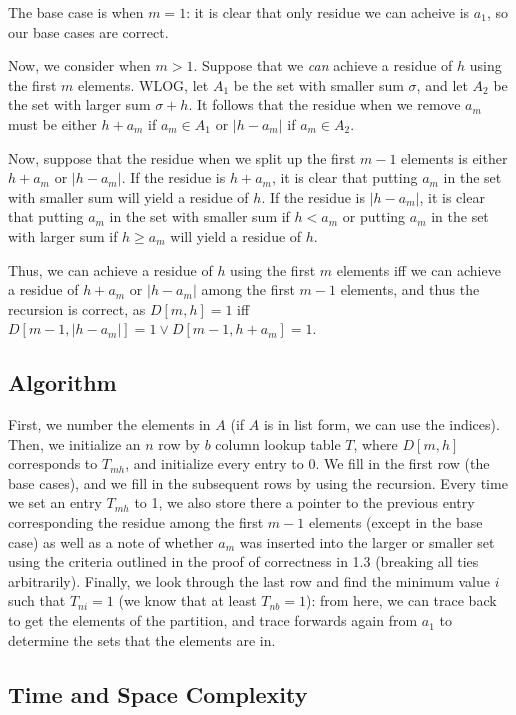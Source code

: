 \documentclass[10pt,letter]{article}
\begin{document}
The base case is when $m = 1$: it is clear that only residue we can acheive is $a_1$, so our base cases are correct.

Now, we consider when $m > 1$. Suppose that we \textit{can} achieve a residue of $h$ using the first $m$ elements. WLOG, let $A_1$ be the set with smaller sum $\sigma$, and let $A_2$ be the set with larger sum $\sigma + h$. It follows that the residue when we remove $a_m$ must be either $h + a_m$ if $a_m \in A_1$ or $\vert h - a_m \vert$ if $a_m \in A_2$.

Now, suppose that the residue when we split up the first $m - 1$ elements is either $h + a_m$ or $\vert h - a_m \vert$. If the residue is $h + a_m$, it is clear that putting $a_m$ in the set with smaller sum will yield a residue of $h$. If the residue is $\vert h - a_m \vert$, it is clear that putting $a_m$ in the set with smaller sum if $h < a_m$ or putting $a_m$ in the set with larger sum if $h \geq a_m$ will yield a residue of $h$.

Thus, we can achieve a residue of $h$ using the first $m$ elements iff we can achieve a residue of $h + a_m$ or $\vert h - a_m \vert$ among the first $m - 1$ elements, and thus the recursion is correct, as $D[m, h] = 1$ iff $D[m - 1, \vert h - a_m \vert] = 1 \lor  D[m - 1, h + a_m] = 1$.

\subsection{Algorithm}

First, we number the elements in $A$ (if $A$ is in list form, we can use the indices). Then, we initialize an $n$ row by $b$ column lookup table $T$, where $D[m, h]$ corresponds to $T_{mh}$, and initialize every entry to 0. We fill in the first row (the base cases), and we fill in the subsequent rows by using the recursion. Every time we set an entry $T_{mh}$ to 1, we also store there a pointer to the previous entry corresponding the residue among the first $m - 1$ elements (except in the base case) as well as a note of whether $a_m$ was inserted into the larger or smaller set using the criteria outlined in the proof of correctness in 1.3 (breaking all ties arbitrarily). Finally, we look through the last row and find the minimum value $i$ such that $T_{ni} = 1$ (we know that at least $T_{nb} = 1$): from here, we can trace back to get the elements of the partition, and trace forwards again from $a_1$ to determine the sets that the elements are in. 

\subsection{Time and Space Complexity}
\end{document}
